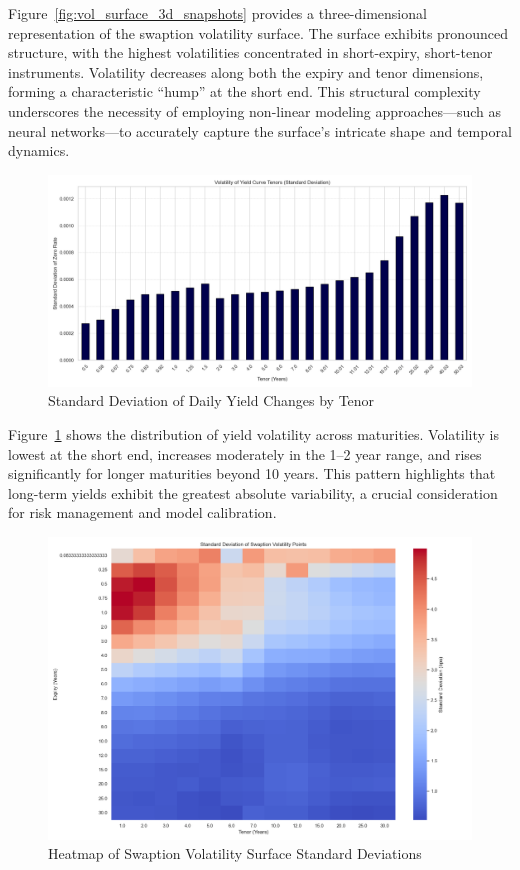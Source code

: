 Figure~\ref{fig:vol_surface_3d_snapshots} provides a three-dimensional representation of the swaption volatility surface. The surface exhibits pronounced structure, with the highest volatilities concentrated in short-expiry, short-tenor instruments. Volatility decreases along both the expiry and tenor dimensions, forming a characteristic “hump” at the short end. This structural complexity underscores the necessity of employing non-linear modeling approaches—such as neural networks—to accurately capture the surface’s intricate shape and temporal dynamics.

\begin{figure}[H]
	\centering
	\includegraphics[width=1\textwidth]{images/descriptive_data_analysis/yield_curve_std_by_tenor.png}
	\caption{Standard Deviation of Daily Yield Changes by Tenor}
	\label{fig:yield_curve_std_by_tenor}
\end{figure}

Figure~\ref{fig:yield_curve_std_by_tenor} shows the distribution of yield volatility across maturities. Volatility is lowest at the short end, increases moderately in the 1–2 year range, and rises significantly for longer maturities beyond 10 years. This pattern highlights that long-term yields exhibit the greatest absolute variability, a crucial consideration for risk management and model calibration.

\begin{figure}[H]
	\centering
	\includegraphics[width=1\textwidth]{images/descriptive_data_analysis/vol_surface_std_heatmap.png}
	\caption{Heatmap of Swaption Volatility Surface Standard Deviations}
	\label{fig:vol_surface_std_heatmap}
\end{figure}

